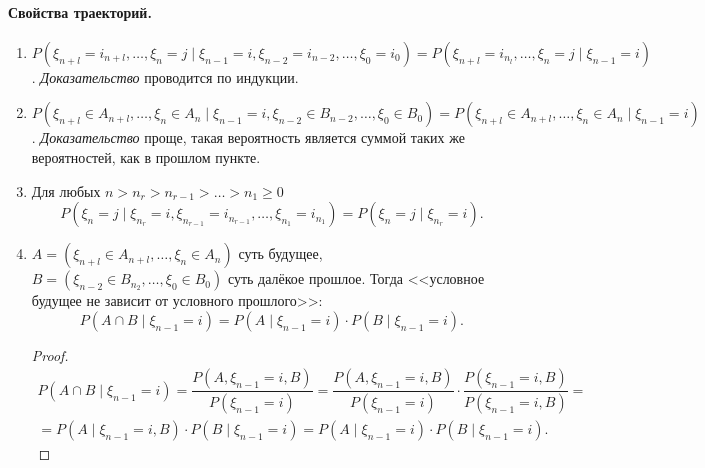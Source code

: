 \paragraph{Свойства траекторий.}
\begin{enumerate}
  \item $P(\xi_{n+l} = i_{n+l}, \dots, \xi_n=j \mid \xi_{n-1}=i, \xi_{n-2} =
    i_{n-2}, \dots, \xi_0 = i_0) = P(\xi_{n+l} = i_{n_l}, \dots, \xi_n = j \mid \xi_{n-1} = i)$.
    \emph{Доказательство} проводится по индукции.

  \item $P(\xi_{n+l} \in A_{n+l}, \dots, \xi_n\in A_{n} \mid \xi_{n-1} = i,
    \xi_{n-2} \in B_{n-2}, \dots, \xi_0 \in B_0) = P(\xi_{n+l} \in A_{n+l},
    \dots, \xi_n \in A_n \mid \xi_{n-1} = i)$. \emph{Доказательство} проще,
    такая вероятность является суммой таких же вероятностей, как в прошлом пункте.

  \item Для любых $n > n_r > n_{r-1} > \ldots > n_1 \geqslant 0$
    \[
      P(\xi_n = j \mid \xi_{n_r}=i, \xi_{n_{r-1}} = i_{n_{r-1}}, \dots, \xi_{n_1} =
      i_{n_1})
      = P(\xi_n=j \mid \xi_{n_r} = i).
    \]

  \item $A = \left( \xi_{n+l} \in A_{n+l}, \dots, \xi_n \in A_n \right)$ суть
    будущее,
    $B = \left( \xi_{n-2}\in B_{n_2}, \ldots, \xi_0 \in B_0 \right) $ суть далёкое прошлое.
    Тогда <<условное будущее не зависит от условного прошлого>>:
    \[
      P(A \cap B \mid \xi_{n-1} =i) = P(A \mid \xi_{n-1} = i) \cdot P(B \mid
      \xi_{n-1} = i).
    \]
    \begin{proof}
      \begin{multline*}
        P(A \cap B \mid \xi_{n-1} = i) = \dfrac{P(A, \xi_{n-1} = i, B)}{P(\xi_{n-1} = i)} 
        = \dfrac{P(A, \xi_{n-1} = i, B)}{P(\xi_{n-1} = i)} \cdot \dfrac{P(\xi_{n-1}=i, B)}{P(\xi_{n-1}=i, B)} = \\
        = P(A \mid \xi_{n-1}=i, B) \cdot P(B \mid \xi_{n-1}=i)
        = P(A \mid \xi_{n-1}=i) \cdot P(B \mid \xi_{n-1}=i).
      \end{multline*}
    \end{proof}
\end{enumerate}

